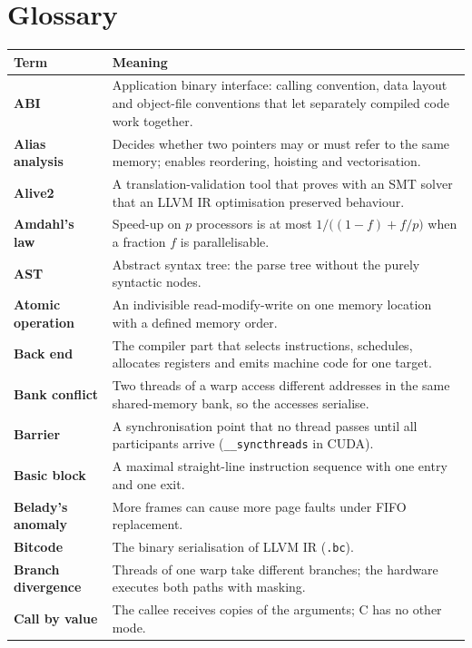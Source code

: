 \documentclass[10pt,a4paper,openany,oneside]{report}
\begin{document}
\chapter{Glossary}
\label{app:gloss}

\begin{center}\small
\begin{xltabular}{\textwidth}{@{}L{3.6cm}Y@{}}
\toprule
\textbf{Term} & \textbf{Meaning}\\
\midrule\endhead
\textbf{ABI} & Application binary interface: calling convention, data layout and object-file conventions that let separately compiled code work together.\\
\textbf{Alias analysis} & Decides whether two pointers may or must refer to the same memory; enables reordering, hoisting and vectorisation.\\
\textbf{Alive2} & A translation-validation tool that proves with an SMT solver that an LLVM IR optimisation preserved behaviour.\\
\textbf{Amdahl's law} & Speed-up on $p$ processors is at most $1/\big((1-f)+f/p\big)$ when a fraction $f$ is parallelisable.\\
\textbf{AST} & Abstract syntax tree: the parse tree without the purely syntactic nodes.\\
\textbf{Atomic operation} & An indivisible read-modify-write on one memory location with a defined memory order.\\
\textbf{Back end} & The compiler part that selects instructions, schedules, allocates registers and emits machine code for one target.\\
\textbf{Bank conflict} & Two threads of a warp access different addresses in the same shared-memory bank, so the accesses serialise.\\
\textbf{Barrier} & A synchronisation point that no thread passes until all participants arrive (\texttt{\_\_syncthreads} in CUDA).\\
\textbf{Basic block} & A maximal straight-line instruction sequence with one entry and one exit.\\
\textbf{Belady's anomaly} & More frames can cause more page faults under FIFO replacement.\\
\textbf{Bitcode} & The binary serialisation of LLVM IR (\texttt{.bc}).\\
\textbf{Branch divergence} & Threads of one warp take different branches; the hardware executes both paths with masking.\\
\textbf{Call by value} & The callee receives copies of the arguments; C has no other mode.\\

\end{xltabular}
\end{center}
\end{document}
